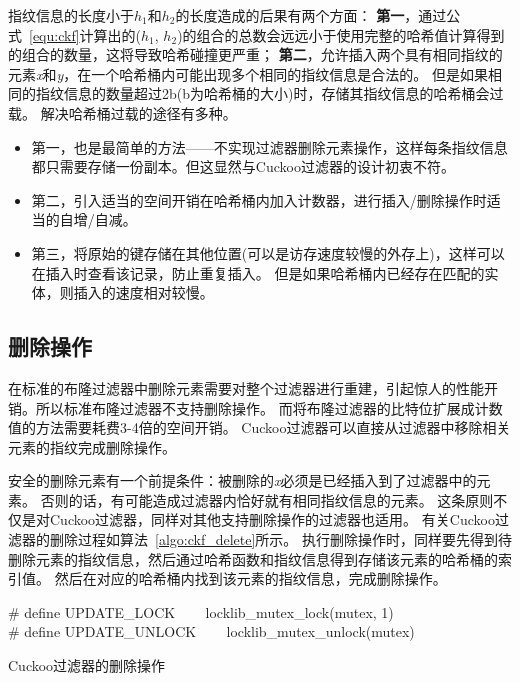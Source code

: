 指纹信息的长度小于$h_1$和$h_2$的长度造成的后果有两个方面：
\textbf{第一}，通过公式~\ref{equ:ckf}计算出的($h_1$, $h_2$)的组合的总数会远远小于使用完整的哈希值计算得到的组合的数量，这将导致哈希碰撞更严重；
\textbf{第二}，允许插入两个具有相同指纹的元素\textit{x}和\textit{y}，在一个哈希桶内可能出现多个相同的指纹信息是合法的。
但是如果相同的指纹信息的数量超过2b(b为哈希桶的大小)时，存储其指纹信息的哈希桶会过载。
解决哈希桶过载的途径有多种。
\begin{itemize}
	\item 第一，也是最简单的方法——不实现过滤器删除元素操作，这样每条指纹信息都只需要存储一份副本。但这显然与Cuckoo过滤器的设计初衷不符。
	\item 第二，引入适当的空间开销在哈希桶内加入计数器，进行插入/删除操作时适当的自增/自减。
	\item 第三，将原始的键存储在其他位置(可以是访存速度较慢的外存上)，这样可以在插入时查看该记录，防止重复插入。
	但是如果哈希桶内已经存在匹配的实体，则插入的速度相对较慢。
\end{itemize}	

\subsection{删除操作}
在标准的布隆过滤器中删除元素需要对整个过滤器进行重建，引起惊人的性能开销。所以标准布隆过滤器不支持删除操作。
而将布隆过滤器的比特位扩展成计数值的方法需要耗费3-4倍的空间开销。
Cuckoo过滤器可以直接从过滤器中移除相关元素的指纹完成删除操作。

安全的删除元素有一个前提条件：被删除的\textit{x}必须是已经插入到了过滤器中的元素。
否则的话，有可能造成过滤器内恰好就有相同指纹信息的元素。
这条原则不仅是对Cuckoo过滤器，同样对其他支持删除操作的过滤器也适用。
有关Cuckoo过滤器的删除过程如算法~\ref{algo:ckf_delete}所示。
执行删除操作时，同样要先得到待删除元素的指纹信息，然后通过哈希函数和指纹信息得到存储该元素的哈希桶的索引值。
然后在对应的哈希桶内找到该元素的指纹信息，完成删除操作。

\begin{algorithm}[htbp]
\SetAlgoLined
\# define UPDATE\_LOCK ~~~ locklib\_mutex\_lock(mutex, 1)\\
\# define UPDATE\_UNLOCK ~~~ locklib\_mutex\_unlock(mutex)\\
\caption{Cuckoo过滤器的删除操作}
\label{algo:ckf_delete}
\end{algorithm}

